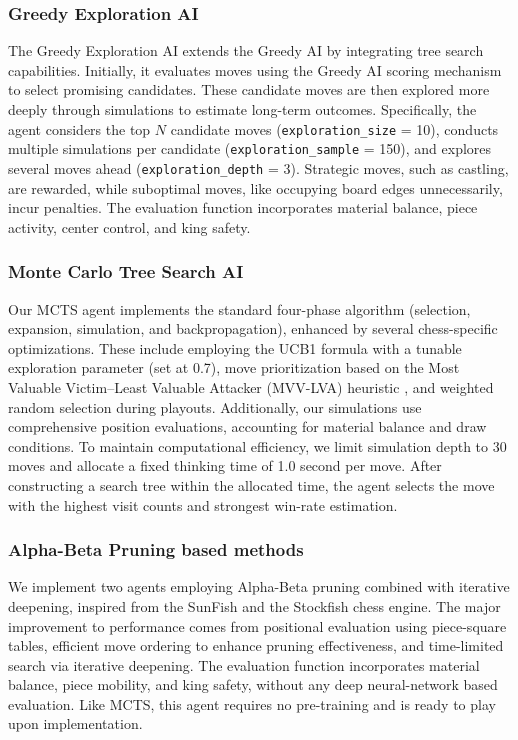 \documentclass[journal, a4paper]{IEEEtran}
\begin{document}
\subsubsection{Greedy Exploration AI}
The Greedy Exploration AI extends the Greedy AI by integrating tree search capabilities. Initially, it evaluates moves using the Greedy AI scoring mechanism to select promising candidates. These candidate moves are then explored more deeply through simulations to estimate long-term outcomes. Specifically, the agent considers the top $N$ candidate moves (\texttt{exploration\_size} = 10), conducts multiple simulations per candidate (\texttt{exploration\_sample} = 150), and explores several moves ahead (\texttt{exploration\_depth} = 3). Strategic moves, such as castling, are rewarded, while suboptimal moves, like occupying board edges unnecessarily, incur penalties. The evaluation function incorporates material balance, piece activity, center control, and king safety.

\subsubsection{Monte Carlo Tree Search AI}
Our MCTS agent implements the standard four-phase algorithm (selection, expansion, simulation, and backpropagation), enhanced by several chess-specific optimizations. These include employing the UCB1 formula with a tunable exploration parameter (set at 0.7), move prioritization based on the Most Valuable Victim–Least Valuable Attacker (MVV-LVA) heuristic \cite{1012769}, and weighted random selection during playouts. Additionally, our simulations use comprehensive position evaluations, accounting for material balance and draw conditions. To maintain computational efficiency, we limit simulation depth to 30 moves and allocate a fixed thinking time of 1.0 second per move. After constructing a search tree within the allocated time, the agent selects the move with the highest visit counts and strongest win-rate estimation.

\subsubsection{Alpha-Beta Pruning based methods}
We implement two agents employing Alpha-Beta pruning combined with iterative deepening, inspired from the SunFish and the Stockfish chess engine. The major improvement to performance comes from positional evaluation using piece-square tables, efficient move ordering to enhance pruning effectiveness, and time-limited search via iterative deepening. The evaluation function incorporates material balance, piece mobility, and king safety, without any deep neural-network based evaluation. Like MCTS, this agent requires no pre-training and is ready to play upon implementation.
\end{document}
